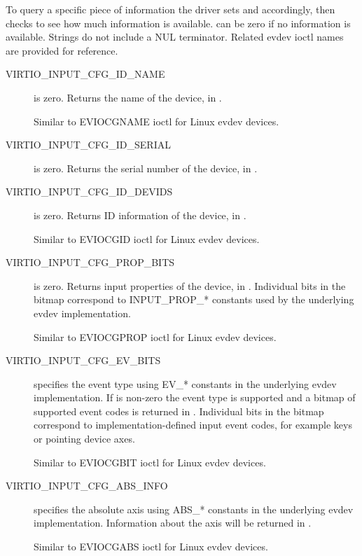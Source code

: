 To query a specific piece of information the driver sets
 and  accordingly, then checks 
to see how much information is available.   can be
zero if no information is available.  Strings do not include a
NUL terminator. Related evdev ioctl names are provided for reference.
\begin{description}

\item[VIRTIO_INPUT_CFG_ID_NAME]
 is zero.
Returns the name of the device, in .

Similar to EVIOCGNAME ioctl for Linux evdev devices.

\item[VIRTIO_INPUT_CFG_ID_SERIAL]
 is zero.
Returns the serial number of the device, in .

\item[VIRTIO_INPUT_CFG_ID_DEVIDS]
 is zero.
Returns ID information of the device, in .

Similar to EVIOCGID ioctl for Linux evdev devices.

\item[VIRTIO_INPUT_CFG_PROP_BITS]
 is zero.
Returns input properties of the device, in .
Individual bits in the bitmap correspond to INPUT_PROP_*
constants used by the underlying evdev implementation.

Similar to EVIOCGPROP ioctl for Linux evdev devices.

\item[VIRTIO_INPUT_CFG_EV_BITS]
 specifies the event type using EV_*
constants in the underlying evdev implementation. If
 is non-zero the event type is supported and
a bitmap of supported event codes is returned in .
Individual bits in the bitmap correspond to
implementation-defined input event codes, for example keys
or pointing device axes.

Similar to EVIOCGBIT ioctl for Linux evdev devices.

\item[VIRTIO_INPUT_CFG_ABS_INFO]
 specifies the absolute axis using ABS_*
constants in the underlying evdev implementation.
Information about the axis will be returned in .

Similar to EVIOCGABS ioctl for Linux evdev devices.

\end{description}

